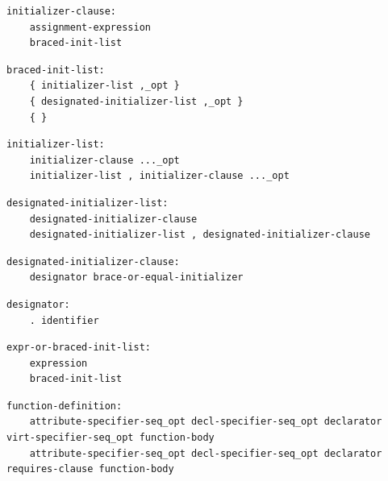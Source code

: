 \noindent\textbf{\texttt{}}\par
\begin{lstlisting}
initializer-clause:
    assignment-expression
    braced-init-list
\end{lstlisting}

\noindent\textbf{\texttt{}}\par
\begin{lstlisting}
braced-init-list:
    { initializer-list ,_opt }
    { designated-initializer-list ,_opt }
    { }
\end{lstlisting}

\noindent\textbf{\texttt{}}\par
\begin{lstlisting}
initializer-list:
    initializer-clause ..._opt
    initializer-list , initializer-clause ..._opt
\end{lstlisting}

\noindent\textbf{\texttt{}}\par
\begin{lstlisting}
designated-initializer-list:
    designated-initializer-clause
    designated-initializer-list , designated-initializer-clause
\end{lstlisting}

\noindent\textbf{\texttt{}}\par
\begin{lstlisting}
designated-initializer-clause:
    designator brace-or-equal-initializer
\end{lstlisting}

\noindent\textbf{\texttt{}}\par
\begin{lstlisting}
designator:
    . identifier
\end{lstlisting}

\noindent\textbf{\texttt{}}\par
\begin{lstlisting}
expr-or-braced-init-list:
    expression
    braced-init-list
\end{lstlisting}

\noindent\textbf{\texttt{}}\par
\begin{lstlisting}
function-definition:
    attribute-specifier-seq_opt decl-specifier-seq_opt declarator virt-specifier-seq_opt function-body
    attribute-specifier-seq_opt decl-specifier-seq_opt declarator requires-clause function-body
\end{lstlisting}

